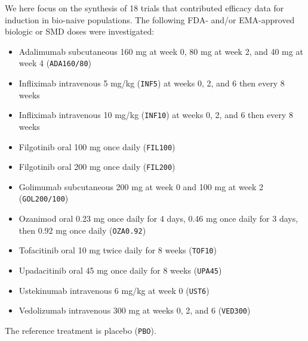 \documentclass[
  letterpaper,
  DIV=11,
  numbers=noendperiod]{scrreprt}
\providecommand{\tightlist}{%
  \setlength{\itemsep}{0pt}\setlength{\parskip}{0pt}}\usepackage{longtable,booktabs,array}
\begin{document}
We here focus on the synthesis of 18 trials that contributed efficacy
data for induction in bio-naive populations. The following FDA- and/or
EMA-approved biologic or SMD doses were investigated:

\begin{itemize}
\tightlist
\item
  Adalimumab subcutaneous 160 mg at week 0, 80 mg at week 2, and 40 mg
  at week 4 (\texttt{ADA160/80})
\item
  Infliximab intravenous 5 mg/kg (\texttt{INF5}) at weeks 0, 2, and 6
  then every 8 weeks
\item
  Infliximab intravenous 10 mg/kg (\texttt{INF10}) at weeks 0, 2, and 6
  then every 8 weeks
\item
  Filgotinib oral 100 mg once daily (\texttt{FIL100})
\item
  Filgotinib oral 200 mg once daily (\texttt{FIL200})
\item
  Golimumab subcutaneous 200 mg at week 0 and 100 mg at week 2
  (\texttt{GOL200/100})
\item
  Ozanimod oral 0.23 mg once daily for 4 days, 0.46 mg once daily for 3
  days, then 0.92 mg once daily (\texttt{OZA0.92})
\item
  Tofacitinib oral 10 mg twice daily for 8 weeks (\texttt{TOF10})
\item
  Upadacitinib oral 45 mg once daily for 8 weeks (\texttt{UPA45})
\item
  Ustekinumab intravenous 6 mg/kg at week 0 (\texttt{UST6})
\item
  Vedolizumab intravenous 300 mg at weeks 0, 2, and 6 (\texttt{VED300})
\end{itemize}

The reference treatment is placebo (\texttt{PBO}).
\end{document}
